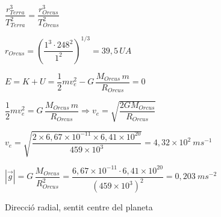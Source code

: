 \begin{solapartat}
 $\dfrac{r_{Terra}^3}{T_{Terra}^2} = \dfrac{r_{Orcus}^3}{T_{Orcus}^2}$

\medskip
{} $r_{Orcus} = \left(\dfrac{1^3\cdot 248^2}{1^2}\right)^{1/3} = 39,5\,UA$
\end{solapartat}

\begin{solapartat}
 $E = K + U = \dfrac{1}{2}mv_e^2 - G\,\dfrac{M_{Orcus}\,m}{R_{Orcus}} = 0$

\smallskip
{} $\dfrac{1}{2}mv_e^2 = G\,\dfrac{M_{Orcus}\,m}{R_{Orcus}} \Rightarrow v_e = \sqrt{\dfrac{2GM_{Orcus}}{R_{Orcus}}}$

\medskip
{} $v_e = \sqrt{\dfrac{2\times 6,67\times 10^{-11}\times 6,41\times 10^{20}}{459\times 10^{3}}} = 4,32\times 10^{2}\ ms^{-1}$

\medskip
{} $\left|\vec{g}\right| = G\,\dfrac{M_{Orcus}}{R_{Orcus}^2} = \dfrac{6,67\times 10^{-11}\cdot 6,41\times 10^{20}}{\left(459\times 10^{3}\right)^2} = 0,203\ ms^{-2}$

\smallskip
Direcció radial, sentit centre del planeta
\end{solapartat}

